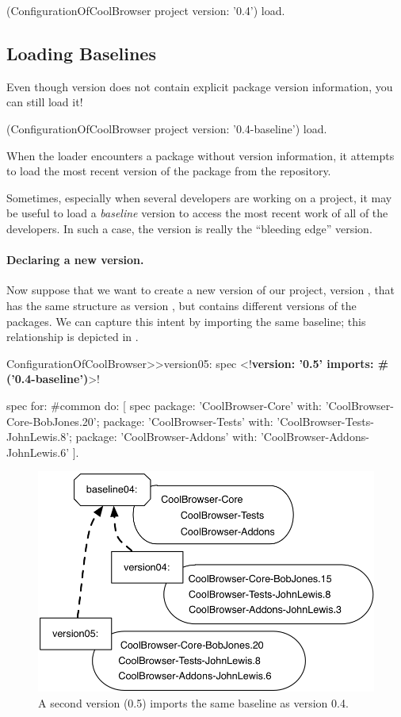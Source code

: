 \documentclass[a4paper,10pt,twoside]{book}
\begin{document}
\begin{code}{}
(ConfigurationOfCoolBrowser project version: '0.4') load.
\end{code}

\subsection{Loading Baselines}
Even though version  does not contain explicit package version information, you can still load it!   
\begin{code}{}
(ConfigurationOfCoolBrowser project version: '0.4-baseline') load.
\end{code}
\noindent
When the loader encounters a package without version information, it attempts to load the most recent version of the package from the repository.

Sometimes, especially when several developers are working on a project, it may be useful to load a \emph{baseline} version to access the most recent work of all of the developers.  In such a case, the  version is really the ``bleeding edge'' version.

\paragraph{Declaring a new version.}
Now suppose that we want to create a new version of our project, version , that has the same structure as version , but contains different  versions of the packages.  We can capture this intent by importing the same baseline; this relationship is depicted in .


\begin{code}{} 
ConfigurationOfCoolBrowser>>version05: spec 
       <!\textbf{version: '0.5' imports: \#('0.4-baseline')}>!
       
      spec for: #common do: [
            spec 
                  package: 'CoolBrowser-Core' with: 'CoolBrowser-Core-BobJones.20';
                  package: 'CoolBrowser-Tests' with: 'CoolBrowser-Tests-JohnLewis.8';
                  package: 'CoolBrowser-Addons' with: 'CoolBrowser-Addons-JohnLewis.6' ].
\end{code}

\begin{figure}
\begin{center}
\includegraphics[width=0.6\linewidth]{version05}
\caption{A second version (0.5) imports the same baseline as version 0.4.}\label{fig:version05}
\end{center}
\end{figure} 
\end{document}
